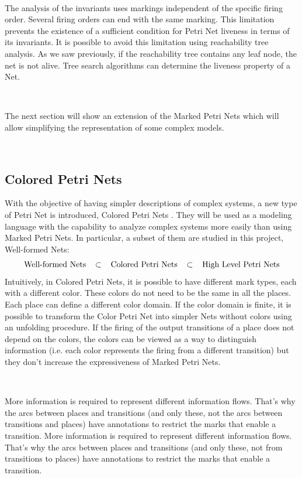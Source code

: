 \documentclass[12pt,english]{article} %
\begin{document}
\

The analysis of the invariants uses markings independent of the specific firing order.
Several firing orders can end with the same marking.
This limitation prevents the existence of a sufficient condition for Petri Net liveness in terms of its invariants.
It is possible to avoid this limitation using reachability tree analysis.
As we saw previously, if the reachability tree contains any leaf node, the net is not alive.
Tree search algorithms can determine the liveness property of a Net.



\

The next section will show an extension of the Marked Petri Nets which will allow simplifying the representation of some complex models.

\

\subsection{Colored Petri Nets}
With the objective of having simpler descriptions of complex systems, a new type of Petri Net is introduced, Colored Petri Nets \cite{lecture-notes-concurrent-systems-validation}.
They will be used as a modeling language with the capability to analyze complex systems more easily than using Marked Petri Nets.
In particular, a subset of them are studied in this project, Well-formed Nets:
$$\text{Well-formed Nets} \hspace{0.3cm} \subset  \hspace{0.3cm} \text{Colored Petri Nets}  \hspace{0.3cm} \subset  \hspace{0.3cm} \text{High Level Petri Nets}$$
Intuitively, in Colored Petri Nets, it is possible to have different mark types, each with a different color.
These colors do not need to be the same in all the places.
Each place can define a different color domain.
If the color domain is finite, it is possible to transform the Color Petri Net into simpler Nets without colors using an unfolding procedure.
If the firing of the output transitions of a place does not depend on the colors, the colors can be viewed as a way to distinguish information (i.e. each color represents the firing from a different transition) but they don't increase the expressiveness of Marked Petri Nets.

\

More information is required to represent different information flows.
That's why the arcs between places and transitions (and only these, not the arcs between transitions and places) have annotations to restrict the marks that enable a transition.
More information is required to represent different information flows.
That's why the arcs between places and transitions (and only these, not from transitions to places) have annotations to restrict the marks that enable a transition.
\end{document}

